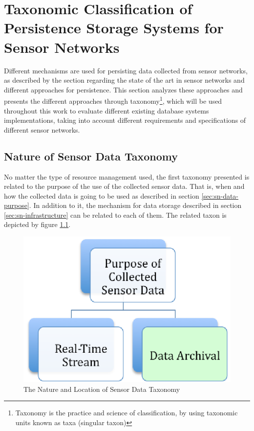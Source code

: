 

\chapter{Taxonomic Classification of Persistence Storage Systems for Sensor
Networks}
\label{chap:taxonomies}

Different mechanisms are used for persisting data collected from sensor
networks, as described by the section regarding the state of the art in sensor
networks and different approaches for persistence. This section analyzes these
approaches and presents the different approaches through 
taxonomy\footnote{Taxonomy is the practice and science of classification, by
using taxonomic units known as taxa (singular taxon)}, which will be used
throughout this work to evaluate different existing database systems
implementations, taking into account different requirements and specifications
of different sensor networks.

\section{Nature of Sensor Data Taxonomy}

No matter the type of resource management used, the first taxonomy presented is
related to the purpose of the use of the collected sensor data. That is, when
and how the collected data is going to be used as described in section
\ref{sec:sn-data-purpose}. In addition to it, the mechanism for data storage
described in section \ref{sec:sn-infrastructure} can be related to each of
them. The related taxon is depicted by figure \ref{fig:taxonomy-data-purpose}.

\begin{figure}[h]
  \centering
  \includegraphics{../diagrams/taxonomy-data-purpose}
  \caption{The Nature and Location of Sensor Data Taxonomy}
  \label{fig:taxonomy-data-purpose}
\end{figure}

